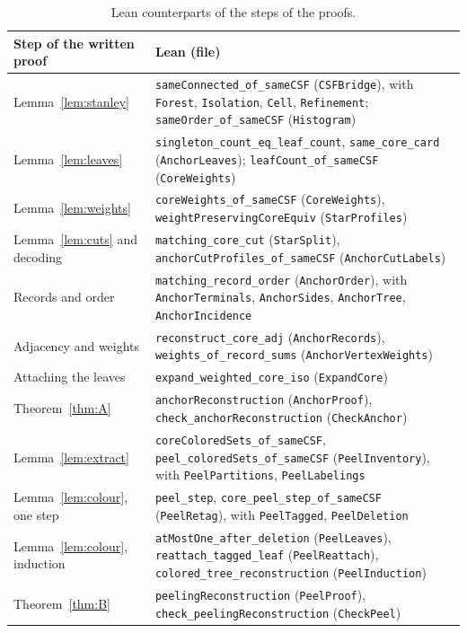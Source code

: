 \documentclass[11pt]{article}
\theoremstyle{definition}
\theoremstyle{remark}
\begin{document}
{\begin{table}[!htbp]
\centering\footnotesize
\renewcommand{\arraystretch}{1.05}
\begin{tabular}{@{}>{\raggedright\arraybackslash}p{}>{\raggedright\arraybackslash}p{}@{}}
\hline
Step of the written proof & Lean (file) \\
\hline
Lemma~\ref{lem:stanley} & \texttt{sameConnected\_of\_sameCSF} (\texttt{CSFBridge}),
with \texttt{Forest}, \texttt{Isolation}, \texttt{Cell}, \texttt{Refinement};
\texttt{sameOrder\_of\_sameCSF} (\texttt{Histogram}) \\
Lemma~\ref{lem:leaves} & \texttt{singleton\_count\_eq\_leaf\_count},
\texttt{same\_core\_card} (\texttt{AnchorLeaves}); \texttt{leafCount\_of\_sameCSF}
(\texttt{CoreWeights}) \\
Lemma~\ref{lem:weights} & \texttt{coreWeights\_of\_sameCSF} (\texttt{CoreWeights}),
\texttt{weightPreservingCoreEquiv} (\texttt{StarProfiles}) \\
Lemma~\ref{lem:cuts} and decoding & \texttt{matching\_core\_cut} (\texttt{StarSplit}),
\texttt{anchorCutProfiles\_of\_sameCSF} (\texttt{AnchorCutLabels}) \\
Records and order & \texttt{matching\_record\_order} (\texttt{AnchorOrder}), with
\texttt{AnchorTerminals}, \texttt{AnchorSides}, \texttt{AnchorTree},
\texttt{AnchorIncidence} \\
Adjacency and weights & \texttt{reconstruct\_core\_adj} (\texttt{AnchorRecords}),
\texttt{weights\_of\_record\_sums} (\texttt{AnchorVertexWeights}) \\
Attaching the leaves & \texttt{expand\_weighted\_core\_iso} (\texttt{ExpandCore}) \\
Theorem~\ref{thm:A} & \texttt{anchorReconstruction} (\texttt{AnchorProof}),
\texttt{check\_anchorReconstruction} (\texttt{CheckAnchor}) \\
\hline
Lemma~\ref{lem:extract} & \texttt{coreColoredSets\_of\_sameCSF},
\texttt{peel\_coloredSets\_of\_sameCSF} (\texttt{PeelInventory}), with
\texttt{PeelPartitions}, \texttt{PeelLabelings} \\
Lemma~\ref{lem:colour}, one step & \texttt{peel\_step},
\texttt{core\_peel\_step\_of\_sameCSF} (\texttt{PeelRetag}), with \texttt{PeelTagged},
\texttt{PeelDeletion} \\
Lemma~\ref{lem:colour}, induction & \texttt{atMostOne\_after\_deletion}
(\texttt{PeelLeaves}), \texttt{reattach\_tagged\_leaf} (\texttt{PeelReattach}),
\texttt{colored\_tree\_reconstruction} (\texttt{PeelInduction}) \\
Theorem~\ref{thm:B} & \texttt{peelingReconstruction} (\texttt{PeelProof}),
\texttt{check\_peelingReconstruction} (\texttt{CheckPeel}) \\
\hline
\end{tabular}
\caption{Lean counterparts of the steps of the proofs.}
\label{tab:lean}
\end{table}

}
\end{document}
